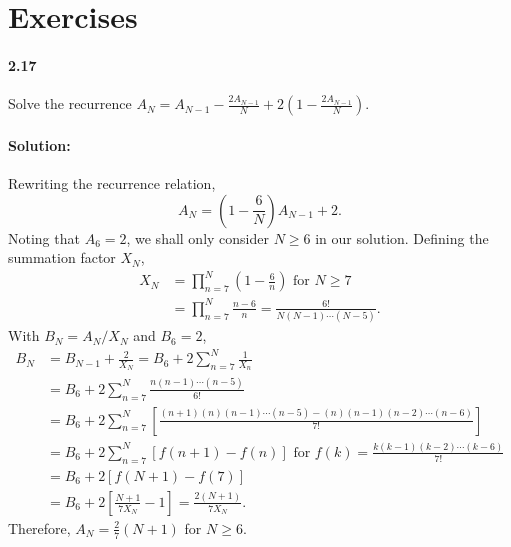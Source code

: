 \documentclass{article}
\begin{document}
\section*{Exercises}

\paragraph{2.17} Solve the recurrence $A_N = A_{N - 1} - \frac{2A_{N - 1}}{N} +
2(1 - \frac{2A_{N - 1}}{N})$.

\paragraph{Solution:} Rewriting the recurrence relation, \begin{equation*}
  A_N = \left(1 - \frac{6}{N}\right)A_{N - 1} + 2.
\end{equation*} Noting that $A_6 = 2$, we shall only consider $N \geq 6$ in our
solution. Defining the summation factor $X_N$, \begin{align*}
  X_N &= \prod_{n = 7}^N \left(1 - \frac{6}{n}\right) \text{ for } N \geq 7
    \\
    &= \prod_{n = 7}^N \frac{n - 6}{n} = \frac{6!}{N(N - 1) \cdots (N - 5)}.
\end{align*} With $B_N = A_N/X_N$ and $B_6 = 2$, \begin{align*}
  B_N &= B_{N - 1} + \frac{2}{X_N} = B_6 + 2\sum_{n = 7}^N\frac{1}{X_n} \\
    &= B_6 + 2\sum_{n = 7}^N \frac{n(n - 1)\cdots(n - 5)}{6!} \\
    &= B_6 + 2\sum_{n = 7}^N \left[\frac{(n + 1)(n)(n - 1)\cdots(n -
      5) - (n)(n - 1)(n - 2)\cdots(n - 6)}{7!}\right] \\
    &= B_6 + 2\sum_{n = 7}^N [f(n + 1) - f(n)] \text{ for } f(k) =
      \frac{k(k - 1)(k - 2)\cdots(k - 6)}{7!} \\
    &= B_6 + 2[f(N + 1) - f(7)] \\
    &= B_6 + 2\left[\frac{N + 1}{7X_N} - 1\right] = \frac{2(N + 1)}{7X_N}.
\end{align*} Therefore, $A_N = \frac{2}{7}(N + 1)$ for $N \geq 6$.
\end{document}

